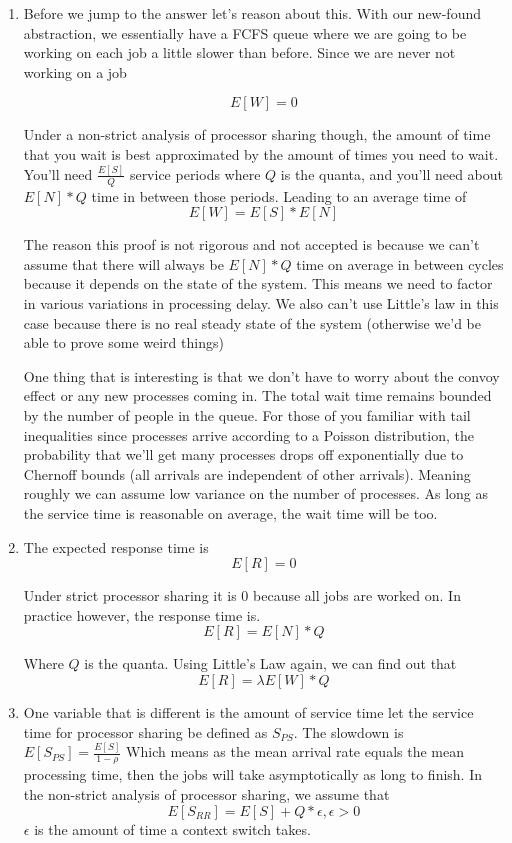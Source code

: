 \begin{enumerate}
  \item Before we jump to the answer let's reason about this.
    With our new-found abstraction, we essentially have a FCFS queue where we are going to be working on each job a little slower than before.
    Since we are never not working on a job

    \[
    E[W] = 0
    \]

  Under a non-strict analysis of processor sharing though, the amount of time that you wait is best approximated by the amount of times you need to wait.
  You'll need $\frac{E[S]}{Q}$ service periods where $Q$ is the quanta, and you'll need about $E[N] * Q$ time in between those periods.
  Leading to an average time of
  \[
  E[W] = E[S] * E[N]
  \]

  The reason this proof is not rigorous and not accepted is because we can't assume that there will always be $E[N] * Q$ time on average in between cycles because it depends on the state of the system.
  This means we need to factor in various variations in processing delay.
  We also can't use Little's law in this case because there is no real steady state of the system (otherwise we'd be able to prove some weird things)

  One thing that is interesting is that we don't have to worry about the convoy effect or any new processes coming in.
  The total wait time remains bounded by the number of people in the queue.
  For those of you familiar with tail inequalities since processes arrive according to a Poisson distribution, the probability that we'll get many processes drops off exponentially due to Chernoff bounds (all arrivals are independent of other arrivals).
  Meaning roughly we can assume low variance on the number of processes.
  As long as the service time is reasonable on average, the wait time will be too.

\item The expected response time is
  \[
  E[R] = 0
  \]

  Under strict processor sharing it is 0 because all jobs are worked on.
  In practice however, the response time is.
  \[
  E[R] = E[N] * Q
  \]

  Where $Q$ is the quanta.
  Using Little's Law again, we can find out that
  \[
  E[R] = \lambda E[W] * Q
  \]
\item One variable that is different is the amount of service time let the service time for processor sharing be defined as $S_{PS}$.
  The slowdown is $E[S_{PS}] = \frac{E[S]}{1 - \rho}$
  Which means as the mean arrival rate equals the mean processing time, then the jobs will take asymptotically as long to finish.
  In the non-strict analysis of processor sharing, we assume that
  \[
    E[S_{RR}] = E[S] + Q * \epsilon, \epsilon > 0
  \]
    $\epsilon$ is the amount of time a context switch takes.


\end{enumerate}
